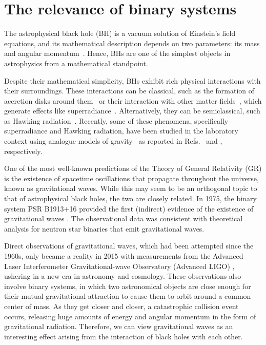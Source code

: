 \section*{The relevance of binary systems}

The astrophysical black hole (\ac{BH}) is a vacuum solution of Einstein's field equations, and its mathematical description depends on two parameters: its mass and angular momentum~\cite{1986bhmp.book.....T}. Hence, \acp{BH} are one of the simplest objects in astrophysics from a mathematical standpoint.

Despite their mathematical simplicity, \acp{BH} exhibit rich physical interactions with their surroundings. These interactions can be classical, such as the formation of accretion disks around them~\cite{Abramowicz2013} or their interaction with other matter fields~\cite{Ficarra2023}, which generate effects like superradiance~\cite{PhysRevD.87.043513}. Alternatively, they can be semiclassical, such as Hawking radiation~\cite{Wald2001}. Recently, some of these phenomena, specifically superradiance and Hawking radiation, have been studied in the laboratory context using analogue models of gravity~\cite{Barcel2011} as reported in Refs.~\cite{Torres2017} and \cite{Kolobov2021}, respectively.

One of the most well-known predictions of the Theory of General Relativity (\ac{GR}) is the existence of spacetime oscillations that propagate throughout the universe, known as gravitational waves. While this may seem to be an orthogonal topic to that of astrophysical black holes, the two are closely related. In 1975, the binary system PSR B1913$+$16 provided the first (indirect) evidence of the existence of gravitational waves \cite{1975ApJ...195L..51H}. The observational data was consistent with theoretical analysis for neutron star binaries that emit gravitational waves.

Direct observations of gravitational waves, which had been attempted since the 1960s, only became a reality in 2015 with measurements from the Advanced Laser Interferometer Gravitational-wave Observatory (Advanced LIGO) \cite{grav1,grav2}, ushering in a new era in astronomy and cosmology. These observations also involve binary systems, in which two astronomical objects are close enough for their mutual gravitational attraction to cause them to orbit around a common center of mass. As they get closer and closer, a catastrophic collision event occurs, releasing huge amounts of energy and angular momentum in the form of gravitational radiation. Therefore, we can view gravitational waves as an interesting effect arising from the interaction of black holes with each other.

